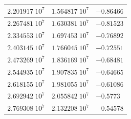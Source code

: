 \documentclass[10pt,a4paper]{book}
\begin{document}
\begin{tabular}{|l|l|l|}
\hline
$2.201917\;10^7$ & $1.564817\;10^7$ & $-0.86466$ \\
\hline
$2.267481\;10^7$ & $1.630381\;10^7$ & $-0.81523$ \\
\hline
$2.334553\;10^7$ & $1.697453\;10^7$ & $-0.76892$ \\
\hline
$2.403145\;10^7$ & $1.766045\;10^7$ & $-0.72551$ \\
\hline
$2.473269\;10^7$ & $1.836169\;10^7$ & $-0.68481$ \\
\hline
$2.544935\;10^7$ & $1.907835\;10^7$ & $-0.64665$ \\
\hline
$2.618155\;10^7$ & $1.981055\;10^7$ & $-0.61086$ \\
\hline
$2.692942\;10^7$ & $2.055842\;10^7$ & $-0.5773$ \\
\hline
$2.769308\;10^7$ & $2.132208\;10^7$ & $-0.54578$ \\
\hline

\end{tabular} 
\end{document}
